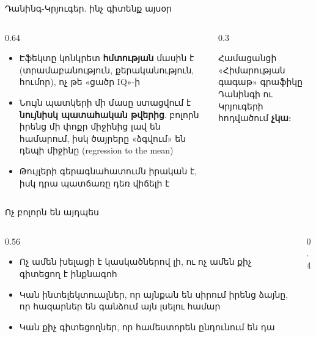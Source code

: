 \begin{frame}{Դանինգ-Կրյուգեր. ինչ գիտենք այսօր}
  \begin{columns}[c]
    \begin{column}{0.64\textwidth}
      \begin{scienceupdate}
        \begin{itemize}\setlength{\itemsep}{0.6mm}
          \item Էֆեկտը կոնկրետ \textbf{հմտության} մասին է (տրամաբանություն, քերականություն, հումոր), ոչ թե «ցածր IQ»-ի
          \item Նույն պատկերի մի մասը ստացվում է \textbf{նույնիսկ պատահական թվերից}. բոլորն իրենց մի փոքր միջինից լավ են համարում, իսկ ծայրերը «ձգվում» են դեպի միջինը (regression to the mean)
          \item Թույլերի գերագնահատումն իրական է, իսկ դրա պատճառը դեռ վիճելի է
        \end{itemize}
      \end{scienceupdate}
    \end{column}
    \begin{column}{0.3\textwidth}
      \centering
      \par\smallskip
      {\small Համացանցի «Հիմարության գագաթ» գրաֆիկը Դանինգի ու Կրյուգերի հոդվածում \textbf{չկա}։\par}
    \end{column}
  \end{columns}
\end{frame}

\begin{frame}{Ոչ բոլորն են այդպես}
  \begin{columns}[c]
    \begin{column}{0.56\textwidth}
      \begin{itemize}
        \item Ոչ ամեն խելացի է կասկածներով լի, ու ոչ ամեն քիչ գիտեցող է ինքնագոհ
        \item<2-> Կան ինտելեկտուալներ, որ այնքան են սիրում իրենց ձայնը, որ հազարներ են գանձում այն լսելու համար
        \item<3-> Կան քիչ գիտեցողներ, որ համեստորեն ընդունում են դա
      \end{itemize}
    \end{column}
    \begin{column}{0.4\textwidth}
    \end{column}
  \end{columns}
\end{frame}

